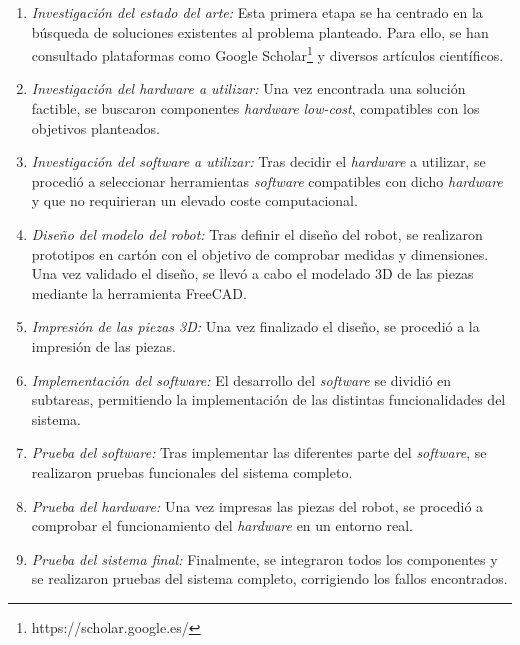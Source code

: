 \begin{enumerate}
	\item \textit{Investigación del estado del arte:} Esta primera etapa se ha centrado en la búsqueda de soluciones existentes al problema planteado. Para ello,  se han consultado plataformas como Google Scholar\footnote{https://scholar.google.es/} y diversos artículos científicos.
	\item \textit{Investigación del hardware a utilizar:} Una vez encontrada una solución factible, se buscaron componentes \textit{hardware} \textit{low-cost}, compatibles con los objetivos planteados.
	\item \textit{Investigación del software a utilizar:} Tras decidir el \textit{hardware} a utilizar, se procedió a seleccionar herramientas \textit{software} compatibles con dicho \textit{hardware} y que no requirieran un elevado coste computacional.
	\item \textit{Diseño del modelo del robot:} Tras definir el diseño del robot, se realizaron prototipos en cartón con el objetivo de comprobar medidas y dimensiones. Una vez validado el diseño, se llevó a cabo el modelado 3D de las piezas mediante la herramienta FreeCAD.
	\item \textit{Impresión de las piezas 3D:} Una vez finalizado el diseño, se procedió a la impresión de las piezas.
	\item \textit{Implementación del software:} El desarrollo del \textit{software} se dividió en subtareas, permitiendo la implementación de las distintas funcionalidades del sistema.
	\item \textit{Prueba del software:} Tras implementar las diferentes parte del \textit{software}, se realizaron pruebas funcionales del sistema completo.
	\item \textit{Prueba del hardware:} Una vez impresas las piezas del robot, se procedió a comprobar el funcionamiento del \textit{hardware} en un entorno real.
	\item \textit{Prueba del sistema final:}  Finalmente, se integraron todos los componentes y se realizaron pruebas del sistema completo, corrigiendo los fallos encontrados.

\end{enumerate}
